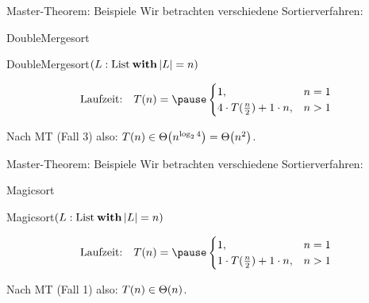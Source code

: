 \begin{frame}[t]{Master-Theorem: Beispiele}
	Wir betrachten verschiedene Sortierverfahren:\\
	\bigskip
	
	\begin{exampleblock}{DoubleMergesort}
		\begin{algorithm}[H]
			\KwMethod DoubleMergesort$(L: \|List| \: \KwSty{with} \size{L} = n)$
		\end{algorithm}
	\end{exampleblock}	
	
	\[\text{Laufzeit:} \quad T(n) = \pause \begin{cases}
	1, & n = 1\\
	4 \cdot T(\fract n/2 ) + 1 \cdot n,  & n > 1
	\end{cases}\]
	
	\pause
	Nach MT (Fall 3) also: $T(n) \in \Theta\!\left(n^{\log_2 4}\right) = \Theta\!\left(n^2\right)$.
\end{frame}

\begin{frame}[t]{Master-Theorem: Beispiele}
	Wir betrachten verschiedene Sortierverfahren:\\
	\bigskip
		
	\begin{exampleblock}{Magicsort}
		\begin{algorithm}[H]
			\KwMethod Magicsort$(L: \|List| \: \KwSty{with} \size{L} = n)$
		\end{algorithm}
	\end{exampleblock}
	
	\[\text{Laufzeit:} \quad T(n) = \pause \begin{cases}
	1, & n = 1\\
	1 \cdot T(\fract n/2 ) + 1 \cdot n, & n > 1
	\end{cases}\]
	
	\pause
	Nach MT (Fall 1) also: $T(n) \in \Theta\!\left(n\right)$.
\end{frame}

